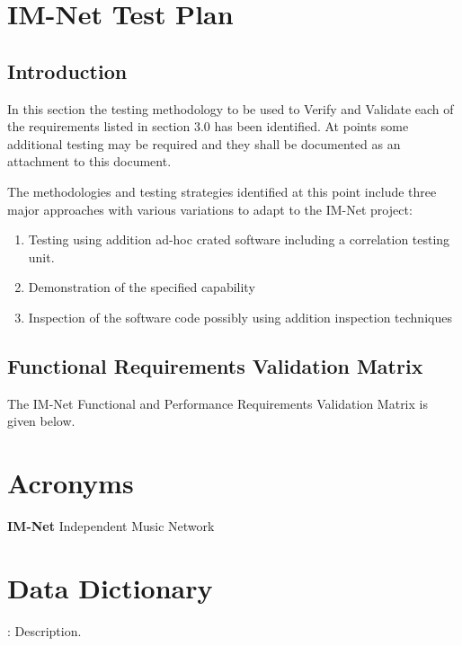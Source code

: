 \documentclass[letterpaper]{article}
\begin{document}
\eject 

\section{\textcolor{section}{IM-Net Test Plan}}

\subsection{\textcolor{subsection}{Introduction}}

In this section the testing methodology to be used to Verify and Validate each of the requirements listed in section 3.0 has been identified. At points some additional testing may be required and they shall be documented as an attachment to this document. 

The methodologies and testing strategies identified at this point include three major approaches with various variations to adapt to the IM-Net project:

\begin{enumerate}
\item  Testing using addition ad-hoc crated software including a correlation testing unit.

\item  Demonstration of the specified capability

\item  Inspection of the software code possibly using addition inspection techniques
\end{enumerate}

 
\subsection{\textcolor{subsection}{Functional Requirements Validation Matrix}}
The IM-Net Functional and Performance Requirements Validation Matrix is given below.
\eject 
 
\section{\textcolor{section}{Acronyms}}
\textbf{IM-Net}  Independent Music Network

\eject 
 
\section{\textcolor{section}{Data Dictionary}}

: Description. 
\end{document}

